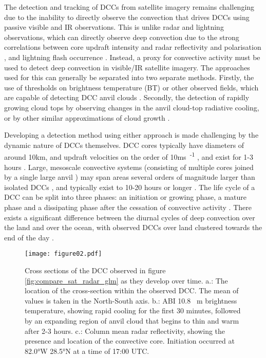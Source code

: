 The detection and tracking of DCCs from satellite imagery remains challenging due to the inability to directly observe the convection that drives DCCs using passive visible and IR observations.
This is unlike radar and lightning observations, which can directly observe deep convection due to the strong correlations between core updraft intensity and radar reflectivity and polarisation \citep{austin_relation_1987, rosenfeld_general_1993, zipser_vertical_1994},  and lightning flash occurrence \citep{williams_relationship_1989, deierling_total_2008, wang_relationship_2017}.
Instead, a proxy for convective activity must be used to detect deep convection in visible/IR satellite imagery.
The approaches used for this can generally be separated into two separate methods. 
Firstly, the use of thresholds on brightness temperature (BT) or other observed fields, which are capable of detecting DCC anvil clouds \citep[e.g.][]{schmetz_monitoring_1997, hong_detection_2005, schroder_deep_2009, liang_integrated_2017, senf_size-resolved_2018}.
Secondly, the detection of rapidly growing cloud tops by observing changes in the anvil cloud-top radiative cooling, or by other similar approximations of cloud growth \citep{zinner_cb-tram:_2008, bedka_objective_2010, muller_novel_2019}.

Developing a detection method using either approach is made challenging by the dynamic nature of DCCs themselves.
DCC cores typically have diameters of around 10\unit{km}, and updraft velocities on the order of 10\unit{ms\textsuperscript{-1}} \citep{weisman_mesoscale_2015}, and exist for 1-3 hours \citep{chen_diurnal_1997}.
Large, mesoscale convective systems (consisting of multiple cores joined by a single large anvil \citep{roca_simple_2017}) may span areas several orders of magnitude larger than isolated DCCs \citep{houze_mesoscale_2004}, and typically exist to 10-20 hours or longer \citep{chen_diurnal_1997}.
The life cycle of a DCC can be split into three phases: an initiation or growing phase, a mature phase and a dissipating phase after the cessation of convective activity \citep{wall_life_2018}.
There exists a significant difference between the diurnal cycles of deep convection over the land and over the ocean, with observed DCCs over land clustered towards the end of the day \citep{taylor_evaluating_2017}.

\begin{figure}[t]
    \texttt{[image: figure02.pdf]}
    \caption{Cross sections of the DCC observed in figure \ref{fig:compare_sat_radar_glm} as they develop over time. a.: The location of the cross-section within the observed DCC. The mean of values is taken in the North-South axis. b.: ABI 10.8 \unit{\mu m} brightness temperature, showing rapid cooling for the first 30 minutes, followed by an expanding region of anvil cloud that begins to thin and warm after 2-3 hours. c.: Column mean radar reflectivity, showing the presence and location of the convective core. Initiation occurred at 82.0°W 28.5°N at a time of 17:00 UTC.}
    \label{fig:dcc_over_time}
\end{figure}

